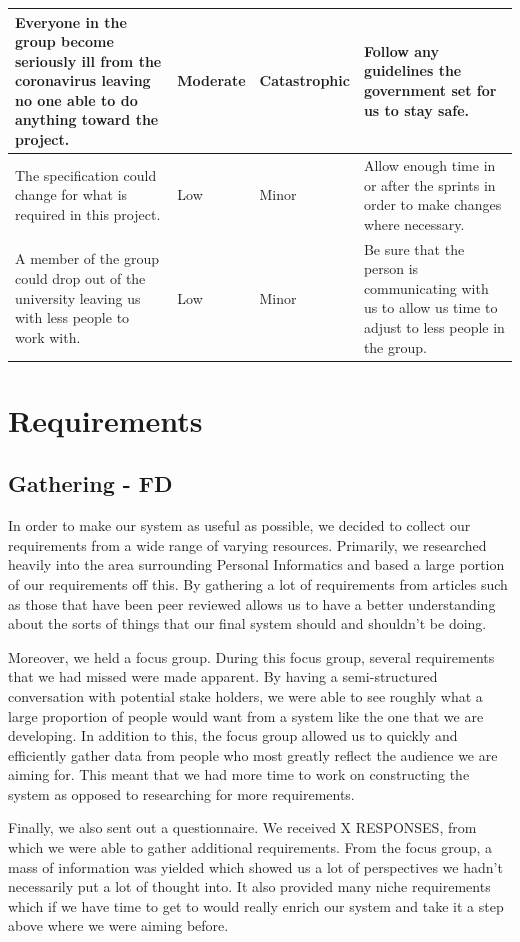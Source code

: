 \documentclass[11pt]{report}
\begin{document}
\begin{longtable}{| p{5cm} | p{2.5cm} | p{2cm} |  p{5.5cm} |}
Everyone in the group become seriously ill from the coronavirus leaving no one able to do anything toward the project.&
Moderate&
Catastrophic&
Follow any guidelines the government set for us to stay safe.\\
\hline

The specification could change for what is required in this project.& 
Low&
Minor&
Allow enough time in or after the sprints in order to make changes where necessary.\\
\hline

A member of the group could drop out of the university leaving us with less people to work with.& 
Low&
Minor&
Be sure that the person is communicating with us to allow us time to adjust to less people in the group.\\
\hline


\end{longtable}

\chapter{Requirements}

\section{Gathering - FD}

In order to make our system as useful as possible, we decided to collect our requirements from a wide range of varying resources. Primarily, we researched heavily into the area surrounding Personal Informatics and based a large portion of our requirements off this. By gathering a lot of requirements from articles such as those that have been peer reviewed allows us to have a better understanding about the sorts of things that our final system should and shouldn’t be doing.

Moreover, we held a focus group. During this focus group, several requirements that we had missed were made apparent. By having a semi-structured conversation with potential stake holders, we were able to see roughly what a large proportion of people would want from a system like the one that we are developing. In addition to this, the focus group allowed us to quickly and efficiently gather data from people who most greatly reflect the audience we are aiming for. This meant that we had more time to work on constructing the system as opposed to researching for more requirements.

Finally, we also sent out a questionnaire. We received X RESPONSES, from which we were able to gather additional requirements. From the focus group, a mass of information was yielded which showed us a lot of perspectives we hadn’t necessarily put a lot of thought into. It also provided many niche requirements which if we have time to get to would really enrich our system and take it a step above where we were aiming before.
\end{document}
